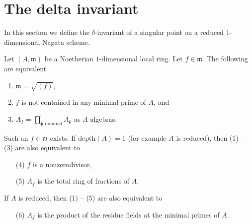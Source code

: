 \section{The delta invariant}
\label{section-delta-invariant}

\noindent
In this section we define the $\delta$-invariant of a singular point
on a reduced $1$-dimensional Nagata scheme.

\begin{lemma}
\label{lemma-pre-pre-delta-invariant}
Let $(A, \mathfrak m)$ be a Noetherian $1$-dimensional local ring.
Let $f \in \mathfrak m$. The following are equivalent
\begin{enumerate}
\item $\mathfrak m = \sqrt{(f)}$,
\item $f$ is not contained in any minimal prime of $A$, and
\item $A_f = \prod_{\mathfrak p\text{ minimal}} A_\mathfrak p$ as $A$-algebras.
\end{enumerate}
Such an $f \in \mathfrak m$ exists. If $\text{depth}(A) = 1$ (for example
$A$ is reduced), then (1) -- (3) are also equivalent to
\begin{enumerate}
\item[(4)] $f$ is a nonzerodivisor,
\item[(5)] $A_f$ is the total ring of fractions of $A$.
\end{enumerate}
If $A$ is reduced, then (1) -- (5) are also equivalent to
\begin{enumerate}
\item[(6)] $A_f$ is the product of the residue fields at the minimal
primes of $A$.
\end{enumerate}
\end{lemma}

